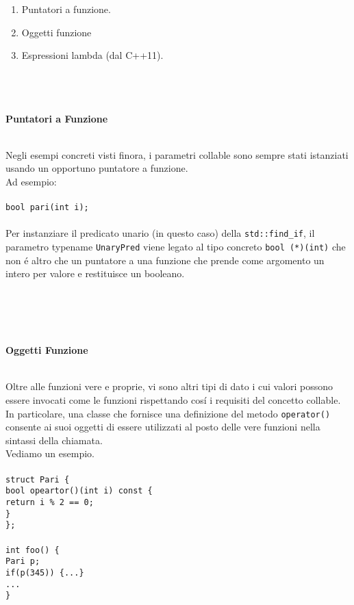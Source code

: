 \documentclass{article}
\newcommand\tab[1][1cm]{\hspace*{#1}}
\begin{document}
\begin{enumerate}
\item Puntatori a funzione.
\item Oggetti funzione
\item Espressioni lambda (dal C++11).
\\ \\ \\ \\ 
\end{enumerate}
\begin{large} \textbf{\textcolor{blu}{Puntatori a Funzione}} \\ \\ \end{large}
Negli esempi concreti visti finora, i parametri collable sono sempre stati istanziati usando un opportuno puntatore a funzione. \\Ad esempio: \\ \\
\texttt{bool pari(int i);} \\ \\
Per instanziare il predicato unario (in questo caso) della \texttt{std::find\_if}, il parametro typename \texttt{UnaryPred} viene legato al tipo concreto \texttt{bool (*)(int)} che non \'e altro che un puntatore a una funzione che prende come argomento un intero per valore e restituisce un booleano.
\\ \\ \\ \\ \\
\begin{large} \textbf{\textcolor{blu}{Oggetti Funzione}} \\ \\ \end{large}
Oltre alle funzioni vere e proprie, vi sono altri tipi di dato i cui valori possono essere invocati come le funzioni rispettando cos\'i i requisiti del concetto collable.\\In particolare, una classe che fornisce una definizione del metodo \texttt{operator()} consente ai suoi oggetti di essere utilizzati al posto delle vere funzioni nella sintassi della chiamata. \\Vediamo un esempio. \\ \\
\texttt{struct Pari \{ \\ \tab bool opeartor()(int i) const \{ \\ \tab \tab return i \% 2 == 0; \\ \tab \} \\ \}; \\ \\ int foo() \{ \\ \tab Pari p; \\ \tab if(p(345)) \{...\} \\ \tab ... \\ \} }\\
\end{document}
